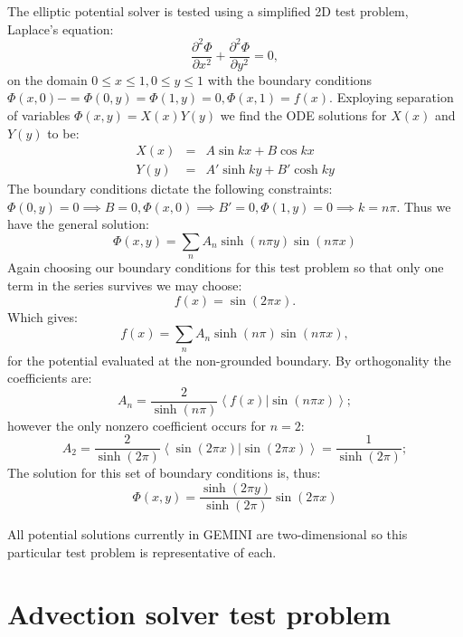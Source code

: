 \documentclass[11pt,letterpaper]{article}
\begin{document}
The elliptic potential solver is tested using a simplified 2D test problem, Laplace's equation:
\begin{equation}
\frac{\partial^2 \Phi}{\partial x^2} + \frac{\partial^2 \Phi}{\partial y^2} = 0, 
\end{equation}
on the domain $0 \le x \le 1, 0 \le y \le 1$ with the boundary conditions $\Phi(x,0)-=\Phi(0,y)=\Phi(1,y)=0, \Phi(x,1)=f(x)$.  Exploying separation of variables $\Phi(x,y)=X(x)Y(y)$ we find the ODE solutions for $X(x)$ and $Y(y)$ to be:
\begin{eqnarray}
X(x) &=& A \sin kx + B \cos kx \\
Y(y) &=& A' \sinh ky + B' \cosh ky
\end{eqnarray}
The boundary conditions dictate the following constraints:  $\Phi(0,y)=0 \implies B=0, \Phi(x,0) \implies B'=0, \Phi(1,y)=0 \implies k=n \pi$.  Thus we have the general solution:
\begin{equation}
\Phi(x,y) = \sum_n A_n \sinh (n \pi y) \sin (n \pi x)
\end{equation}
Again choosing our boundary conditions for this test problem so that only one term in the series survives we may choose:
\begin{equation}
f(x) = \sin(2 \pi x).
\end{equation}
Which gives:
\begin{equation}
f(x) = \sum_n A_n \sinh (n \pi) \sin (n \pi x),
\end{equation}
for the potential evaluated at the non-grounded boundary.  By orthogonality the coefficients are:  
\begin{equation}
A_n = \frac{2}{\sinh (n \pi)} \left< f(x) | \sin (n \pi x) \right>; 
\end{equation}
however the only nonzero coefficient occurs for $n=2$:
\begin{equation}
A_2 = \frac{2}{\sinh (2 \pi)} \left< \sin(2 \pi x) | \sin (2 \pi x) \right> = \frac{1}{\sinh(2 \pi)}; 
\end{equation}
The solution for this set of boundary conditions is, thus: 
\begin{equation}
\Phi(x,y) = \frac{\sinh (2 \pi y)}{\sinh(2 \pi)} \sin (2 \pi x)
\end{equation}

All potential solutions currently in GEMINI are two-dimensional so this particular test problem is representative of each.  


\section{Advection solver test problem}
\end{document}

